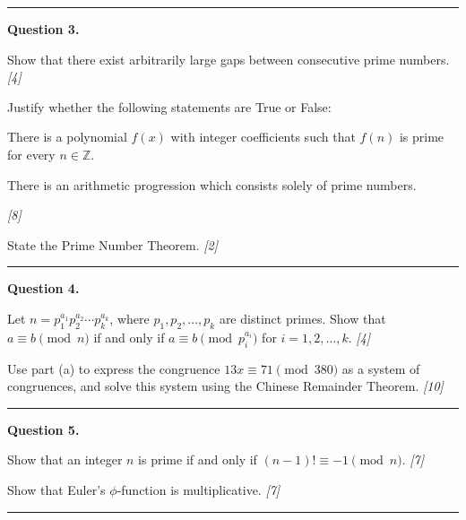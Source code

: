 \documentclass[11pt,a4paper]{article}
\newcommand{\pts}[1]{\hfill   \textit{[#1]}}
\begin{document}
\medskip\rule{\linewidth}{0.2pt}

\medskip


\noindent   \textbf{Question 3.}

\begin{parts}
  \item Show that there exist arbitrarily large gaps between consecutive prime numbers. \pts{4}
  \item Justify whether the following statements are True or False:
  
\begin{parts}
    \item There is a polynomial $f(x)$ with integer coefficients such that $f(n)$ is prime for every $n \in \mathbb{Z}$.
    \item There is an arithmetic progression which consists solely of prime numbers.
  \end{parts} \pts{8}
  \item State the Prime Number Theorem. \pts{2}
\end{parts}

\medskip\rule{\linewidth}{0.2pt}

\medskip


\noindent   \textbf{Question 4.}

\begin{parts}
  \item Let $n = p_1^{a_1} p_2^{a_2} \cdots p_k^{a_k}$, where $p_1, p_2, \dots, p_k$ are distinct primes. Show that $a \equiv b \pmod{n}$ if and only if $a \equiv b \pmod{p_i^{a_i}}$ for $i = 1, 2, \dots, k$. \pts{4}
  \item Use part (a) to express the congruence $13x \equiv 71 \pmod{380}$ as a system of congruences, and solve this system using the Chinese Remainder Theorem. \pts{10}
\end{parts}

\medskip\rule{\linewidth}{0.2pt}

\medskip


\noindent   \textbf{Question 5.}

\begin{parts}
  \item Show that an integer $n$ is prime if and only if $(n-1)! \equiv -1 \pmod{n}$. \pts{7}
  \item Show that Euler's $\phi$-function is multiplicative. \pts{7}
\end{parts}

\medskip\rule{\linewidth}{0.2pt}

\medskip
\end{document}
